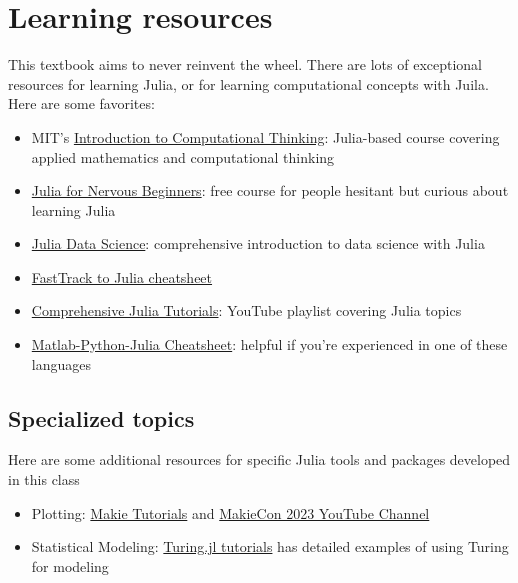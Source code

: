 \documentclass[
  letterpaper,
  DIV=11,
  numbers=noendperiod]{scrreprt}
\providecommand{\tightlist}{%
  \setlength{\itemsep}{0pt}\setlength{\parskip}{0pt}}
\begin{document}
\section{Learning resources}\label{learning-resources}

This textbook aims to never reinvent the wheel. There are lots of
exceptional resources for learning Julia, or for learning computational
concepts with Juila. Here are some favorites:

\begin{itemize}
\tightlist
\item
  MIT's \href{https://computationalthinking.mit.edu}{Introduction to
  Computational Thinking}: Julia-based course covering applied
  mathematics and computational thinking
\item
  \href{https://juliaacademy.com/p/julia-programming-for-nervous-beginners}{Julia
  for Nervous Beginners}: free course for people hesitant but curious
  about learning Julia
\item
  \href{https://juliadatascience.io/}{Julia Data Science}: comprehensive
  introduction to data science with Julia
\item
  \href{https://juliadocs.github.io/Julia-Cheat-Sheet/}{FastTrack to
  Julia cheatsheet}
\item
  \href{https://www.youtube.com/playlist?list=PLCXbkShHt01seTlnlVg6O7f6jKGTguFi7}{Comprehensive
  Julia Tutorials}: YouTube playlist covering Julia topics
\item
  \href{https://cheatsheets.quantecon.org/}{Matlab-Python-Julia
  Cheatsheet}: helpful if you're experienced in one of these languages
\end{itemize}

\subsection{Specialized topics}\label{specialized-topics}

Here are some additional resources for specific Julia tools and packages
developed in this class

\begin{itemize}
\tightlist
\item
  Plotting: \href{https://docs.makie.org/stable/tutorials/}{Makie
  Tutorials} and
  \href{https://youtube.com/playlist?list=PLP8iPy9hna6TXEn99mhG5KaTgjsrCkDzQ&feature=shared}{MakieCon
  2023 YouTube Channel}
\item
  Statistical Modeling:
  \href{https://turinglang.org/docs/getting-started/}{Turing.jl
  tutorials} has detailed examples of using Turing for modeling
\end{itemize}
\end{document}
